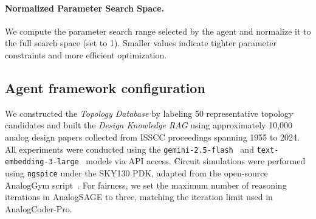 \paragraph{Normalized Parameter Search Space.}
We compute the parameter search range selected by the agent and normalize it to the full search space (set to 1). Smaller values indicate tighter parameter constraints and more efficient optimization.


\subsection{Agent framework configuration}


We constructed the \emph{Topology Database} by labeling 50 representative topology candidates and built the \emph{Design Knowledge RAG} using approximately 10,000 analog design papers collected from ISSCC proceedings \cite{issccISSCCInternational} spanning 1955 to 2024. All experiments were conducted using the \texttt{gemini-2.5-flash}~\cite{comanici2025gemini} and \texttt{text-embedding-3-large}~\cite{neelakantan2022text} models via API access. Circuit simulations were performed using \texttt{ngspice} under the SKY130 PDK, adapted from the open-source AnalogGym script~\cite{10.1145/3676536.3697117}.
For fairness, we set the maximum number of reasoning iterations in AnalogSAGE to three, matching the iteration limit used in AnalogCoder-Pro.

